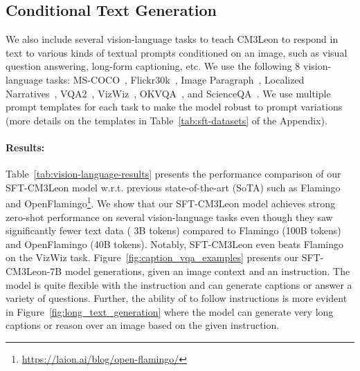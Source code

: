 \documentclass{article}
\newcommand{\model}{CM3Leon}
\begin{document}
\subsection{Conditional Text Generation}
We also include several vision-language tasks to teach \model{} to respond in text to various kinds of textual prompts conditioned on an image, such as visual question answering, long-form captioning, etc. We use the following 8 vision-language tasks: MS-COCO~\citep{chen2015microsoft}, Flickr30k~\citep{young2014image}, Image Paragraph~\citep{krause2017hierarchical}, Localized Narratives~\citep{pont2020connecting}, VQA2~\cite{goyal2017making}, VizWiz~\citep{gurari2018vizwiz}, OKVQA~\citep{marino2019ok}, and ScienceQA~\citep{lu2022learn}. We use multiple prompt templates for each task to make the model robust to prompt variations (more details on the templates in Table~\ref{tab:sft-datasets} of the Appendix).

\paragraph{Results:}
Table~\ref{tab:vision-language-results} presents the performance comparison of our SFT-\model{} model w.r.t. previous state-of-the-art (SoTA) such as Flamingo~\citep{alayrac2022flamingo} and OpenFlamingo\footnote{\url{https://laion.ai/blog/open-flamingo/}}. We show that our SFT-\model{} model achieves strong zero-shot performance on several vision-language tasks even though they saw significantly fewer text data ( 3B tokens) compared to Flamingo (100B tokens) and OpenFlamingo (40B tokens). Notably, SFT-\model{} even beats Flamingo on the VizWiz task. Figure~\ref{fig:caption_vqa_examples} presents our SFT-\model{}-7B model generations, given an image context and an instruction. The model is quite flexible with the instruction and can generate captions or answer a variety of questions. Further, the ability of to follow instructions is more evident in Figure~\ref{fig:long_text_generation} where the model can generate very long captions or reason over an image based on the given instruction. 
\end{document}
